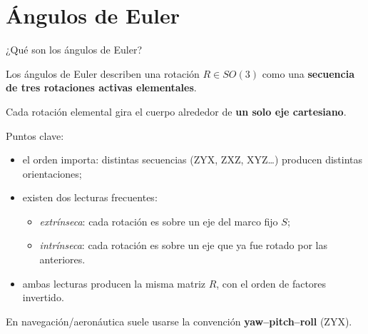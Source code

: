 \documentclass[11pt]{beamer}
\newcommand{\srcShuster}{\href{https://ru.scribd.com/doc/155830038/A-Survey-of-Attitude-Representations}{Shuster (1993)}}
\newcommand{\srcMarkley}{\href{https://notes.jaydickson.net/assets/resources/Textbooks/Markley\%20and\%20Crassidis\%20-\%202014\%20-\%20Fundamentals\%20of\%20Spacecraft\%20Attitude\%20Determination\%20.pdf}{Markley \& Crassidis (2014)}{Markley \& Crassidis (2014)}}
\newcommand{\SourceLine}[1]{\vfill{\tiny\textcolor{gray}{Fuentes: #1}}}
\begin{document}
%
%
%
%





\section{Ángulos de Euler}


\begin{frame}{¿Qué son los ángulos de Euler?}

Los ángulos de Euler describen una rotación \(R \in SO(3)\) como una \textbf{secuencia de tres rotaciones activas elementales}.

\medskip
Cada rotación elemental gira el cuerpo alrededor de \textbf{un solo eje cartesiano}.

\medskip
Puntos clave:
\begin{itemize}
  \item el orden importa: distintas secuencias (ZYX, ZXZ, XYZ\ldots) producen distintas orientaciones;
  \item existen dos lecturas frecuentes:
  \begin{itemize}
    \item \emph{extrínseca}: cada rotación es sobre un eje del marco fijo \(S\);
    \item \emph{intrínseca}: cada rotación es sobre un eje que ya fue rotado por las anteriores.
  \end{itemize}
  \item ambas lecturas producen la misma matriz \(R\), con el orden de factores invertido.
\end{itemize}

\medskip
En navegación/aeronáutica suele usarse la convención \textbf{yaw--pitch--roll} (ZYX).

\end{frame}
\end{document}
